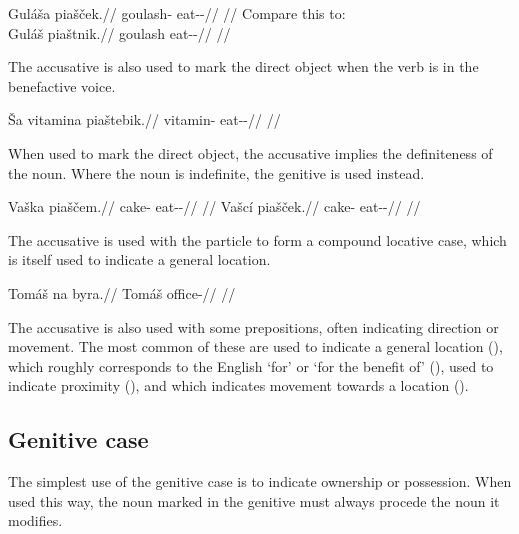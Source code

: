 \pex
\a \begingl
\gla Guláša piašček.//
\glb goulash-\Acc{} eat-\Av{}-\Pf{}//
\glft {}//
\endgl
\a Compare this to:\\
\begingl
\gla Guláš piaštnik.//
\glb goulash eat-\Pv{}-\Pf{}//
\glft {}//
\endgl
\xe

The accusative is also used to mark the direct object when the verb is in the
benefactive voice.

\pex
\begingl
\gla Ša vitamina piaštebik.//
\glb {} vitamin-\Acc{} eat-\Ben{}-\Pf{}//
\glft {}//
\endgl
\xe


When used to mark the direct object, the accusative implies the definiteness of
the noun. Where the noun is indefinite, the genitive is used instead.

\pex
\a\begingl
\gla Vaška piaščem.//
\glb cake-\Acc{} eat-\Av{}-\Pf{}//
\glft {}//
\endgl
\a\begingl
\gla Vašcí piašček.//
\glb cake-\Gen{} eat-\Av{}-\Pf{}//
\glft {}//
\endgl
\xe

The accusative is used with the particle  to form a compound locative
case, which is itself used to indicate a general location.

\pex
\begingl
\gla Tomáš na byra.//
\glb Tomáš \Loc{} office-\Acc{}//
\glft {}//
\endgl
\xe

The accusative is also used with some prepositions, often indicating direction
or movement. The most common of these are  used to indicate a general
location (),  which roughly corresponds to
the English `for' or `for the benefit of' (), 
used to indicate proximity (), and 
which indicates movement towards a location ().

\subsection{Genitive case}\label{sec:genitive-case}

The simplest use of the genitive case is to indicate ownership or possession.
When used this way, the noun marked in the genitive must always procede the noun
it modifies.

\pex
{}\\
\\
\\
\xe


